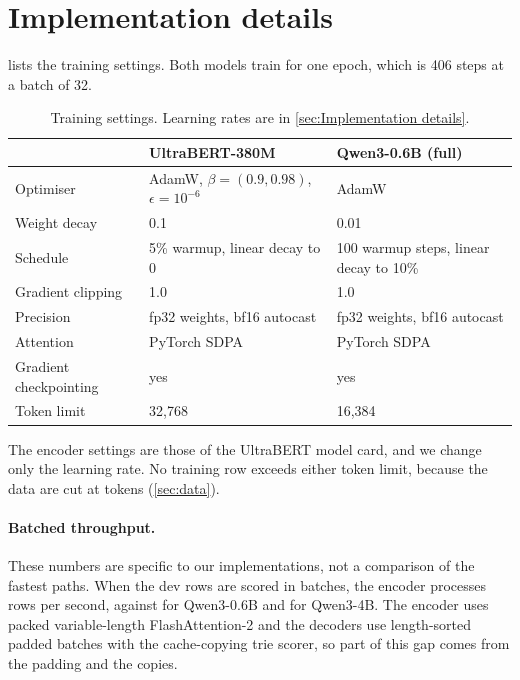 \section{Implementation details}
\label{app:impl}

 lists the training settings.
Both models train for one epoch, which is 406 steps at a batch of 32.

\begin{table}[h]
  \centering\small
  \caption{Training settings. Learning rates are in \cref{sec:Implementation details}.}
  \label{tab:hparams}
  \begin{tabular}{@{}lll@{}}
    \toprule
    & UltraBERT-380M & Qwen3-0.6B (full) \\
    \midrule
    Optimiser & AdamW, $\beta=(0.9, 0.98)$, $\epsilon=10^{-6}$ & AdamW \\
    Weight decay & 0.1 & 0.01 \\
    Schedule & 5\% warmup, linear decay to 0 & 100 warmup steps, linear decay to 10\% \\
    Gradient clipping & 1.0 & 1.0 \\
    Precision & fp32 weights, bf16 autocast & fp32 weights, bf16 autocast \\
    Attention & PyTorch SDPA & PyTorch SDPA \\
    Gradient checkpointing & yes & yes \\
    Token limit & 32{,}768 & 16{,}384 \\
    \bottomrule
  \end{tabular}
\end{table}

The encoder settings are those of the UltraBERT model card, and we change only the learning rate.
No training row exceeds either token limit, because the data are cut at \MaxTokens{} tokens (\cref{sec:data}).

\paragraph{Batched throughput.}
These numbers are specific to our implementations, not a comparison of the fastest paths.
When the dev rows are scored in batches, the encoder processes \RpsUb{} rows per second, against \RpsQwFull{} for Qwen3-0.6B and \RpsQwFourLora{} for Qwen3-4B.
The encoder uses packed variable-length FlashAttention-2 \citep{flashattention2} and the decoders use length-sorted padded batches with the cache-copying trie scorer, so part of this gap comes from the padding and the copies.

